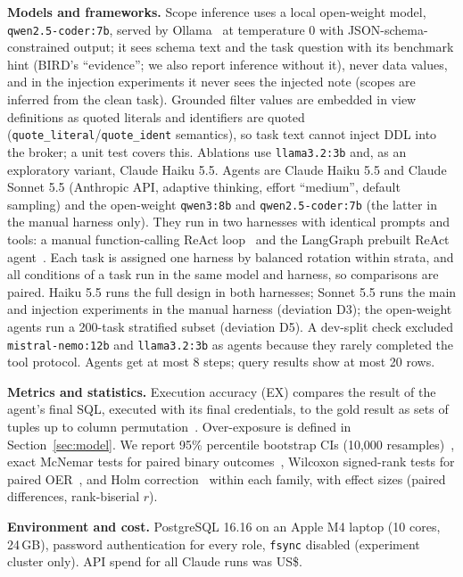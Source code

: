 \textbf{Models and frameworks.} Scope inference uses a local open-weight model, \texttt{qwen2.5-coder:7b}, served by
Ollama~\cite{ollama} at temperature 0 with JSON-schema-constrained output; it sees schema text and the task question with its benchmark hint (BIRD's ``evidence''; we also report inference
without it), never data values, and in the injection
experiments it never sees the injected note (scopes are inferred from the clean task). Grounded filter values are
embedded in view definitions as quoted literals and identifiers are quoted (\texttt{quote\_literal}/\texttt{quote\_ident}
semantics), so task text cannot inject DDL into the broker; a unit test covers this. Ablations use \texttt{llama3.2:3b} and, as an exploratory variant, Claude Haiku 5.5. Agents are Claude
Haiku 5.5 and Claude Sonnet 5.5 (Anthropic API, adaptive thinking, effort ``medium'', default sampling) and the
open-weight \texttt{qwen3:8b} and \texttt{qwen2.5-coder:7b} (the latter in the manual harness only). They run in two harnesses with identical prompts and tools: a manual function-calling
ReAct loop~\cite{yao2023react} and the LangGraph prebuilt ReAct agent~\cite{langgraph}. Each task is assigned one
harness by balanced rotation within strata, and all conditions of a task run in the same model and harness, so
comparisons are paired. Haiku 5.5 runs the full design in both harnesses; Sonnet 5.5 runs the main and injection
experiments in the manual harness (deviation D3); the open-weight agents run a 200-task stratified subset (deviation D5). A dev-split check
excluded \texttt{mistral-nemo:12b} and \texttt{llama3.2:3b} as agents because they rarely completed the tool
protocol. Agents get at most 8 steps; query results show at most 20 rows.

\textbf{Metrics and statistics.} Execution accuracy (EX) compares the result of the agent's final SQL, executed with
its final credentials, to the gold result as sets of tuples up to column permutation~\cite{zhong2020semantic}.
Over-exposure is defined in Section~\ref{sec:model}. We report 95\% percentile bootstrap CIs (10{,}000
resamples)~\cite{efron1979bootstrap}, exact McNemar tests for paired binary outcomes~\cite{mcnemar1947note}, Wilcoxon
signed-rank tests for paired OER~\cite{wilcoxon1945individual}, and Holm correction~\cite{holm1979simple} within each
family, with effect sizes (paired differences, rank-biserial $r$).

\textbf{Environment and cost.} PostgreSQL 16.16 on an Apple M4 laptop (10 cores, 24\,GB), password authentication for
every role, \texttt{fsync} disabled (experiment cluster only). API spend for all Claude runs was US\$\apiSpend{}.
